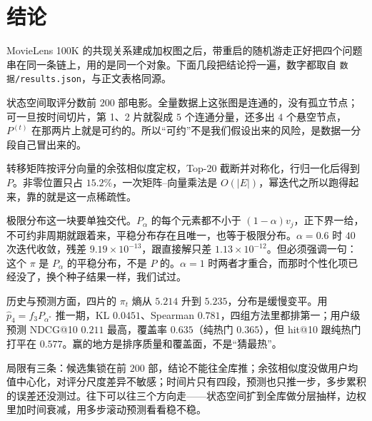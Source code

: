 \documentclass[12pt,a4paper]{ctexart}
\begin{document}
\section{结论}

MovieLens 100K 的共现关系建成加权图之后，带重启的随机游走正好把四个问题串在同一条链上，用的是同一个对象。下面几段把结论捋一遍，数字都取自 \texttt{数据/\allowbreak results.json}，与正文表格同源。

状态空间取评分数前 $200$ 部电影。全量数据上这张图是连通的，没有孤立节点；可一旦按时间切片，第 1、2 片就裂成 $5$ 个连通分量，还多出 $4$ 个悬空节点，$P^{(t)}$ 在那两片上就是可约的。所以“可约”不是我们假设出来的风险，是数据一分段自己冒出来的。

转移矩阵按评分向量的余弦相似度定权，Top-20 截断并对称化，行归一化后得到 $P$。非零位置只占 $15.2\%$，一次矩阵--向量乘法是 $O(|E|)$，幂迭代之所以跑得起来，靠的就是这一点稀疏性。

极限分布这一块要单独交代。$P_{\alpha}$ 的每个元素都不小于 $(1-\alpha)v_j$，正下界一给，不可约非周期就跟着来，平稳分布存在且唯一，也等于极限分布。$\alpha=0.6$ 时 $40$ 次迭代收敛，残差 $9.19\times10^{-13}$，跟直接解只差 $1.13\times10^{-12}$。但必须强调一句：这个 $\pi$ 是 $P_{\alpha}$ 的平稳分布，不是 $P$ 的。$\alpha=1$ 时两者才重合，而那时个性化项已经没了，换个种子结果一样，我们试过。

历史与预测方面，四片的 $\pi_t$ 熵从 $5.214$ 升到 $5.235$，分布是缓慢变平。用 $\hat p_4=f_3P_{\alpha^*}$ 推一期，KL $0.0451$、Spearman $0.781$，四组方法里都排第一；用户级预测 NDCG@10 $0.211$ 最高，覆盖率 $0.635$（纯热门 $0.365$），但 hit@10 跟纯热门打平在 $0.577$。赢的地方是排序质量和覆盖面，不是“猜最热”。

局限有三条：候选集锁在前 $200$ 部，结论不能往全库推；余弦相似度没做用户均值中心化，对评分尺度差异不敏感；时间片只有四段，预测也只推一步，多步累积的误差还没测过。往下可以往三个方向走——状态空间扩到全库做分层抽样，边权里加时间衰减，用多步滚动预测看看稳不稳。
\end{document}
